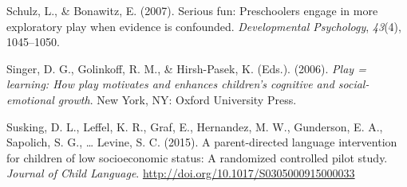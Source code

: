 \documentclass[10pt, letterpaper]{article}
\begin{document}
\hypertarget{ref-Schulz2007}{}
Schulz, L., \& Bonawitz, E. (2007). Serious fun: Preschoolers engage in
more exploratory play when evidence is confounded. \emph{Developmental
Psychology}, \emph{43}(4), 1045--1050.

\hypertarget{ref-Singer2006}{}
Singer, D. G., Golinkoff, R. M., \& Hirsh-Pasek, K. (Eds.). (2006).
\emph{Play = learning: How play motivates and enhances children's
cognitive and social-emotional growth}. New York, NY: Oxford University
Press.

\hypertarget{ref-Suskind2015}{}
Susking, D. L., Leffel, K. R., Graf, E., Hernandez, M. W., Gunderson, E.
A., Sapolich, S. G., \ldots{} Levine, S. C. (2015). A parent-directed
language intervention for children of low socioeconomic status: A
randomized controlled pilot study. \emph{Journal of Child Language}.
\url{http://doi.org/10.1017/S0305000915000033}


\end{document}
